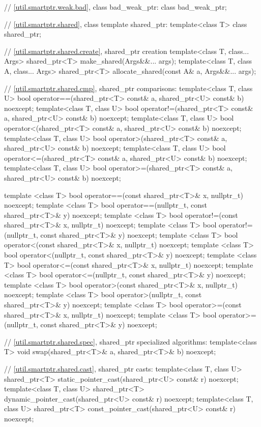 \begin{codeblock}
{  // \ref{util.smartptr.weak.bad}, class bad_weak_ptr:
  class bad_weak_ptr;

  // \ref{util.smartptr.shared}, class template shared_ptr:
  template<class T> class shared_ptr;

  // \ref{util.smartptr.shared.create}, shared_ptr creation
  template<class T, class... Args> shared_ptr<T> make_shared(Args&&... args);
  template<class T, class A, class... Args>
    shared_ptr<T> allocate_shared(const A& a, Args&&... args);

  // \ref{util.smartptr.shared.cmp}, shared_ptr comparisons:
  template<class T, class U>
    bool operator==(shared_ptr<T> const& a, shared_ptr<U> const& b) noexcept;
  template<class T, class U>
    bool operator!=(shared_ptr<T> const& a, shared_ptr<U> const& b) noexcept;
  template<class T, class U>
    bool operator<(shared_ptr<T> const& a, shared_ptr<U> const& b) noexcept;
  template<class T, class U>
    bool operator>(shared_ptr<T> const& a, shared_ptr<U> const& b) noexcept;
  template<class T, class U>
    bool operator<=(shared_ptr<T> const& a, shared_ptr<U> const& b) noexcept;
  template<class T, class U>
    bool operator>=(shared_ptr<T> const& a, shared_ptr<U> const& b) noexcept;

  template <class T>
    bool operator==(const shared_ptr<T>& x, nullptr_t) noexcept;
  template <class T>
    bool operator==(nullptr_t, const shared_ptr<T>& y) noexcept;
  template <class T>
    bool operator!=(const shared_ptr<T>& x, nullptr_t) noexcept;
  template <class T>
    bool operator!=(nullptr_t, const shared_ptr<T>& y) noexcept;
  template <class T>
    bool operator<(const shared_ptr<T>& x, nullptr_t) noexcept;
  template <class T>
    bool operator<(nullptr_t, const shared_ptr<T>& y) noexcept;
  template <class T>
    bool operator<=(const shared_ptr<T>& x, nullptr_t) noexcept;
  template <class T>
    bool operator<=(nullptr_t, const shared_ptr<T>& y) noexcept;
  template <class T>
    bool operator>(const shared_ptr<T>& x, nullptr_t) noexcept;
  template <class T>
    bool operator>(nullptr_t, const shared_ptr<T>& y) noexcept;
  template <class T>
    bool operator>=(const shared_ptr<T>& x, nullptr_t) noexcept;
  template <class T>
    bool operator>=(nullptr_t, const shared_ptr<T>& y) noexcept;

  // \ref{util.smartptr.shared.spec}, shared_ptr specialized algorithms:
  template<class T> void swap(shared_ptr<T>& a, shared_ptr<T>& b) noexcept;

  // \ref{util.smartptr.shared.cast}, shared_ptr casts:
  template<class T, class U>
    shared_ptr<T> static_pointer_cast(shared_ptr<U> const& r) noexcept;
  template<class T, class U>
    shared_ptr<T> dynamic_pointer_cast(shared_ptr<U> const& r) noexcept;
  template<class T, class U>
    shared_ptr<T> const_pointer_cast(shared_ptr<U> const& r) noexcept;

}
\end{codeblock}
